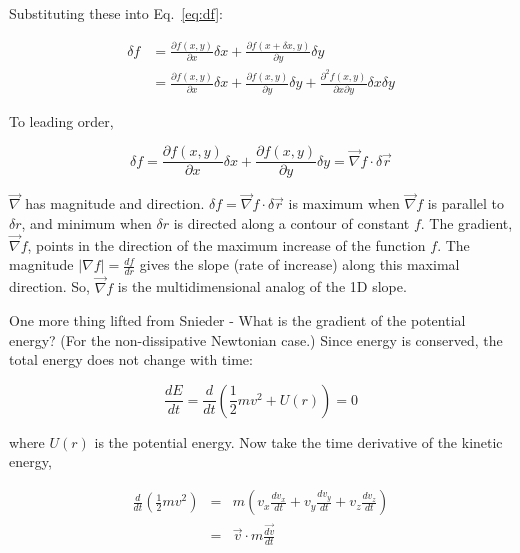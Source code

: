 \documentclass[12pt]{article}
\begin{document}
\begin{flushleft}
Substituting these into Eq.~\ref{eq:df}:

\begin{equation*}
\begin{aligned}
\delta f & = \frac{\partial f(x,y)}{\partial x} \delta x + \frac{\partial f(x+\delta x,y)}{\partial y} \delta y \\
            & = \frac{\partial f(x,y)}{\partial x} \delta x + \frac{\partial f(x,y)}{\partial y} \delta y + \frac{\partial^{2} f(x,y)}{\partial x\partial y} \delta x \delta y
\end{aligned}
\end{equation*}

To leading order,

\begin{equation*}
\delta f  = \frac{\partial f(x,y)}{\partial x} \delta x + \frac{\partial f(x,y)}{\partial y} \delta y = \vec{\nabla}f \cdot \delta \vec{r}
\end{equation*}

$\vec{\nabla}$ has magnitude and direction.  $\delta f = \vec{\nabla}f \cdot \delta \vec{r}$ is maximum when $\vec{\nabla}f$ is parallel to $\delta r$, and minimum when $\delta r$ is directed along a contour of constant $f$.  The gradient, $\vec{\nabla}f$, points in the direction of the maximum increase of the function $f$.  The magnitude $|\nabla f|=\frac{df}{dr}$ gives the slope (rate of increase) along this maximal direction.  So, $\vec{\nabla}f$ is the multidimensional analog of the 1D slope.

One more thing lifted from Snieder - What is the gradient of the potential energy?  (For the non-dissipative Newtonian case.)  Since energy is conserved, the total energy does not change with time:

\begin{equation}
\frac{dE}{dt}  = \frac{d}{dt}\left( \frac{1}{2}mv^{2} +U(r) \right) =0 
\label{eq:energy}
\end{equation}

where $U(r)$ is the potential energy.  Now take the time derivative of the kinetic energy,

\begin{eqnarray}
\frac{d}{dt}\left( \frac{1}{2}mv^{2} \right) & = & m \left( v_{x}\frac{dv_{x}}{dt} +  v_{y}\frac{dv_{y}}{dt} +  v_{z}\frac{dv_{z}}{dt} \right) \nonumber \\
                  & = & \vec{v} \cdot m\frac{\vec{dv}}{dt} 
\label{eq:keterm}
\end{eqnarray}


\end{flushleft}
\end{document}
